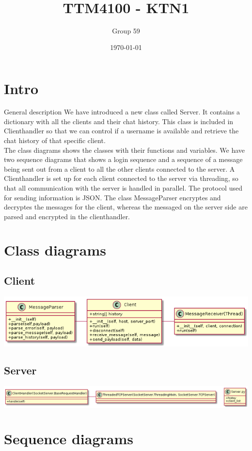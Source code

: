 \documentclass[11pt]{article}
\author{Group 59}
\date{\today}
\title{TTM4100 - KTN1}
\begin{document}
\maketitle
\tableofcontents

\section{Intro}
\label{sec-1}
General description
We have introduced a new class called Server. It contains a dictionary with all
the clients and their chat history. This class is included in Clienthandler so
 that we can control if a username is available and retrieve the chat history of
 that specific client.
\\
The class diagrams shows the classes with their functions and variables. We have
 two sequence diagrams that shows a login sequence and a sequence of a message
 being sent out from a client to all the other clients connected to the server.
 A Clienthandler is set up for each client connected to the server via
 threading, so that all communication with the server is handled in parallel.
 The protocol used for sending information is JSON. The class MessageParser
 encryptes and decryptes the messages for the client, whereas the messaged on
 the server side are parsed and encrypted in the clienthandler.
\section{Class diagrams}
\label{sec-2}
\subsection{Client}
\label{sec-2-1}
\includegraphics[width=.9\linewidth]{client_class.png}
\subsection{Server}
\label{sec-2-2}
\includegraphics[width=.9\linewidth]{server_class.png}

\section{Sequence diagrams}
\label{sec-3}
\end{document}
